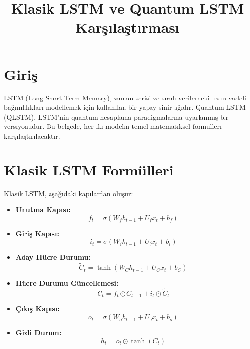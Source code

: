 \documentclass[a4paper,12pt]{article}
\begin{document}
\title{Klasik LSTM ve Quantum LSTM Karşılaştırması}
\author{}
\date{}
\maketitle

\section*{Giriş}
LSTM (Long Short-Term Memory), zaman serisi ve sıralı verilerdeki uzun vadeli bağımlılıkları modellemek için kullanılan bir yapay sinir ağıdır. Quantum LSTM (QLSTM), LSTM'nin quantum hesaplama paradigmalarına uyarlanmış bir versiyonudur. Bu belgede, her iki modelin temel matematiksel formülleri karşılaştırılacaktır.

\section*{Klasik LSTM Formülleri}
Klasik LSTM, aşağıdaki kapılardan oluşur:

\begin{itemize}
    \item \textbf{Unutma Kapısı:}
    \begin{equation}
    f_t = \sigma(W_f h_{t-1} + U_f x_t + b_f)
    \end{equation}
    \item \textbf{Giriş Kapısı:}
    \begin{equation}
    i_t = \sigma(W_i h_{t-1} + U_i x_t + b_i)
    \end{equation}
    \item \textbf{Aday Hücre Durumu:}
    \begin{equation}
    \tilde{C}_t = \tanh(W_C h_{t-1} + U_C x_t + b_C)
    \end{equation}
    \item \textbf{Hücre Durumu Güncellemesi:}
    \begin{equation}
    C_t = f_t \odot C_{t-1} + i_t \odot \tilde{C}_t
    \end{equation}
    \item \textbf{Çıkış Kapısı:}
    \begin{equation}
    o_t = \sigma(W_o h_{t-1} + U_o x_t + b_o)
    \end{equation}
    \item \textbf{Gizli Durum:}
    \begin{equation}
    h_t = o_t \odot \tanh(C_t)
    \end{equation}
\end{itemize}
\end{document}
